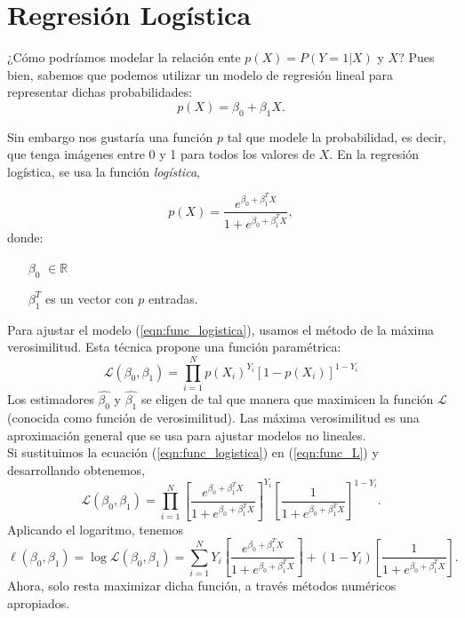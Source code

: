 \documentclass[11pt,letterpaper,reqno]{article}
\begin{document}
\section{Regresión Logística}

¿Cómo podríamos modelar la relación ente $p(X) = P(Y=1|X)$ y $X$? Pues bien, sabemos que podemos utilizar un modelo de regresión lineal para representar dichas probabilidades:
\begin{equation*}
p(X) = \beta_0 + \beta_1X.
\end{equation*}

Sin embargo nos gustaría una función $p$ tal que modele la probabilidad, es decir, que tenga imágenes entre 0 y 1 para todos los valores de $X$. En la regresión logística, se usa la función \textit{logística},

\begin{equation}
	\label{eqn:func_logistica}
	p(X) = \frac{e^{\beta_0 + \beta_1^{T} X}}{1+e^{\beta_0 + \beta_1^{T}X}},
\end{equation}
donde:
\begin{itemize}
	\item[$\beta_0$]$\in \mathbb{R}$
	\item[$\beta_1^T$] es un vector con $p$ entradas.
\end{itemize}
Para ajustar el modelo (\ref{eqn:func_logistica}), usamos el método de la máxima verosimilitud. Esta técnica propone una función paramétrica:
\begin{equation}
	\label{eqn:func_L}
	\mathcal{L}(\beta_{0}, \beta_{1}) = \prod_{i=1}^{N}p(X_i)^{Y_i}[1-p(X_{i})]^{1-Y_i}
\end{equation}
Los estimadores $\hat{\beta_0}$ y $\hat{\beta_1}$ se eligen de tal que manera que maximicen la función $\mathcal{L}$ (conocida como función de verosimilitud). Las máxima verosimilitud es una aproximación general que se usa para ajustar modelos no lineales.\\

Si sustituimos la ecuación (\ref{eqn:func_logistica}) en (\ref{eqn:func_L}) y desarrollando obtenemos,
$$
\mathcal{L}(\beta_{0}, \beta_{1}) =  \prod_{i=1}^{N} \left[ \frac{e^{\beta_0 + \beta_1^{T} X}}{1+e^{\beta_0 + \beta_1^{T}X}} \right]^{Y_i} \left[\frac{1}{1+e^{\beta_0 + \beta_1^{T}X}} \right]^{1-Y_i}.
$$
Aplicando el logaritmo, tenemos
$$
\ell(\beta_{0}, \beta_{1}) = \log\mathcal{L}(\beta_{0}, \beta_{1}) = \sum_{i=1}^{N} Y_i\left[ \frac{e^{\beta_0 + \beta_1^{T} X}}{1+e^{\beta_0 + \beta_1^{T}X}} \right] +  (1-Y_i)\left[\frac{1}{1+e^{\beta_0 + \beta_1^{T}X}} \right].
$$
Ahora, solo resta maximizar dicha función, a través métodos numéricos apropiados.
\end{document}
